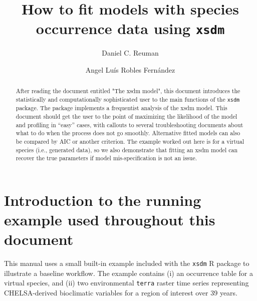 \documentclass[11pt]{article}\usepackage[]{graphicx}\usepackage[]{xcolor}
\title{How to fit models with species occurrence data using \texttt{xsdm}}
\author[1]{Daniel C. Reuman}
\author[1]{Angel Lu\'{i}s Robles Fern\'{a}ndez}
\affil[1]{Department of Ecology and Evolutionary Biology and Center for Ecological Research,
University of Kansas}
\date{}
\begin{document}
\maketitle

\begin{abstract}
\noindent After reading the document entitled "The xsdm model", this document
introduces the statistically and computationally sophisticated user to the 
main functions of the \texttt{xsdm} package. The package implements a frequentist 
analysis of the xsdm model. This document should get the user to the point
of maximizing the likelihood of the model and profiling in ``easy'' cases, 
with callouts to
several troubleshooting documents about what to do when the process does
not go smoothly. Alternative fitted models can also be compared by AIC or another
criterion. The example worked out here is for a virtual species (i.e., generated 
data), so we also demonstrate that fitting an xsdm model can recover the true
parameters if model mis-specification is not an issue.
\end{abstract}

\section{Introduction to the running example used throughout this document}

This manual uses a small built-in example included with the \texttt{xsdm} R 
package to illustrate a baseline workflow. The example contains (i) an
occurrence table for a virtual species, and (ii) two environmental
\texttt{terra} raster time series representing CHELSA-derived 
bioclimatic variables for a region of interest over 39 years.
\end{document}
